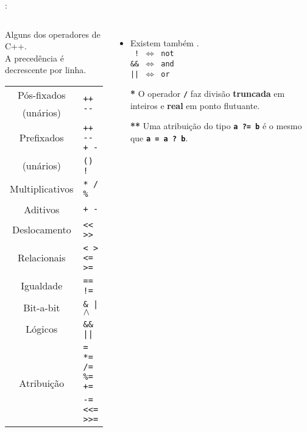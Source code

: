 \begin{frame}{\insertsection: \insertsubsection}

	\begin{columns}[b]
		\begin{block}{\centering Alguns dos operadores de C++.\\{\small A precedência é decrescente por linha.}}
			\begin{tabular}{cl}
				Pós-fixados  & \multirow{2}{*}{\texttt{++ {-}{-}}}        \\
				(unários)    &                                            \\ \hline
				Prefixados   & \texttt{++ {-}{-} + -}                     \\
				(unários)    & \texttt{(\textbf{\HighlightType{tipo}}) !} \\ \hline
				Multiplicativos\HighlightSpecial{*} & \texttt{* / \%}     \\ \hline
				Aditivos     & \texttt{+ -}                               \\ \hline
				Deslocamento & \texttt{{<}{<} {>}{>}}                     \\ \hline
				Relacionais  & \texttt{< > <= >=}                         \\ \hline
				Igualdade    & \texttt{== !=}                             \\ \hline
				Bit-a-bit    & \texttt{\& | $\wedge$}                     \\ \hline
				Lógicos      & \texttt{\&\& ||}                           \\ \hline
				\multirow{2}{*}{Atribuição\HighlightSpecial{**}} & \texttt{= *= /= \%= +=} \\
										 & \texttt{-= <{<}= >{>}=}                    \\ %
			\end{tabular}
		\end{block}

		\begin{itemize}
		\item Existem também .\\
		\texttt{~!~$\Longleftrightarrow$~not}\\
		\texttt{\&\&~$\Longleftrightarrow$~and}\\
		\texttt{||~$\Longleftrightarrow$~or}\smallskip\\
		\item[\textbf{*}] O operador \textbf{\texttt{/}} faz divisão \textbf{truncada} em inteiros e \textbf{real} em ponto flutuante.
		\item[\textbf{**}] Uma atribuição do tipo \textbf{\texttt{a~?=~b}} é o mesmo que \textbf{\texttt{a~=~a~?~b}}.
		\end{itemize}
	\end{columns}


\end{frame}
